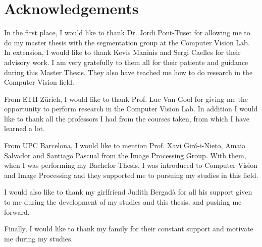 
\chapter*{Acknowledgements}
\label{cha:ack}

In the first place, I would like to thank Dr. Jordi Pont-Tuset for allowing me to do my master thesis with the segmentation group at the Computer Vision Lab. 
In extension, I would like to thank Kevis Maninis and Sergi Caelles for their advisory work. 
I am very gratefully to them all for their patiente and guidance during this Master Thesis. 
They also have teached me how to do research in the Computer Vision field.

From ETH Z\"urich, I would like to thank Prof. Luc Van Gool for giving me the opportunity to perform research in the Computer Vision Lab.
In addition I would like to thank all the professors I had from the courses taken, from which I have learned a lot.

From UPC Barcelona, I would like to mention Prof. Xavi Gir\'o-i-Nieto, Amaia Salvador and Santiago Pascual from the Image Processing Group. 
With them, when I was performing my Bachelor Thesis, I was introduced to Computer Vision and Image Processing and they supported me to pursuing my studies in this field.

I would also like to thank my girlfriend Judith Bergad\`a for all his support given to me during the development of my studies and this thesis, and pushing me forward.

Finally, I would like to thank my family for their constant support and motivate me during my studies. 
